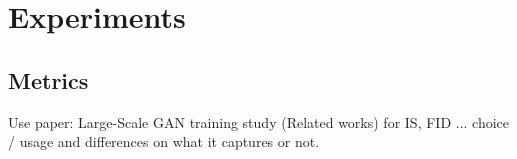 







\section{Experiments}
\label{sec:experiments}

\subsection{Metrics}
Use paper: Large-Scale GAN training study (Related works) for IS, FID ... choice / usage and differences on what it captures or not.

